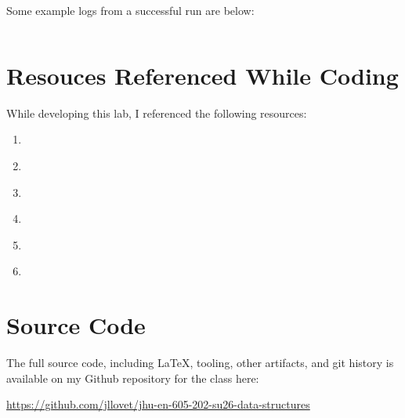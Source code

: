\documentclass[10pt,letterpaper,final]{report}
\begin{document}
Some example logs from a successful run are below:

\pagebreak

\inputminted[breaklines, breakanywhere, fontsize=\footnotesize, frame=single]{text}{demo.lab3.log}

\pagebreak

\section{Resouces Referenced While Coding}

While developing this lab, I referenced the following resources:

\begin{enumerate}
  \item \textcite{zybooks-ds2026}
  \item \textcite{PythondocumentationOperatorStandard}
  \item \textcite{StackOverflowHowToUseDunderMethodsForObjectComparison}
  \item \textcite{EnwikipediaorgTreeTraversal}
  \item \textcite{PythonEnhancementProposalsPEP0636}
  \item \textcite{JoelonSoftware2003AbsoluteMinimumEvery}
\end{enumerate}

\pagebreak

\section{Source Code}
The full source code, including LaTeX, tooling, other artifacts, and git history is available on my Github repository for the class here:
\begin{center}
  \url{https://github.com/jllovet/jhu-en-605-202-su26-data-structures}
\end{center}

\printbibliography[heading=bibintoc]
\end{document}
